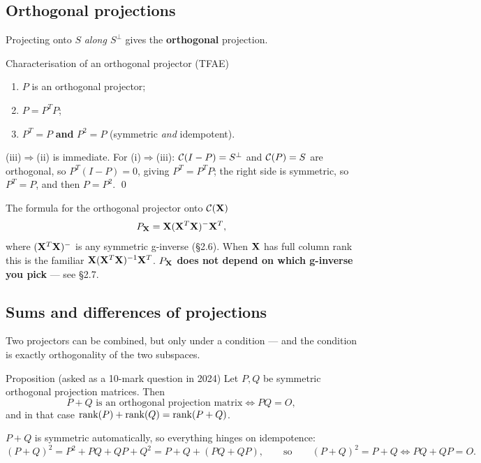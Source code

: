\documentclass[11pt]{article}
\begin{document}
\subsection{Orthogonal projections}

Projecting onto $S$ \emph{along $S^\perp$} gives the \textbf{orthogonal} projection.

\begin{idea}{Characterisation of an orthogonal projector (TFAE)}
\begin{enumerate}[label=(\roman*)]
  \item $P$ is an orthogonal projector;
  \item $P=P^TP$;
  \item $P^T=P$ \textbf{and} $P^2=P$ (symmetric \emph{and} idempotent).
\end{enumerate}
\end{idea}
\prf (iii)$\Rightarrow$(ii) is immediate. For (i)$\Rightarrow$(iii): $\mathcal{C}(I-P)=S^\perp$ and
$\mathcal{C}(P)=S$ are orthogonal, so $P^T(I-P)=0$, giving $P^T=P^TP$; the right side is symmetric,
so $P^T=P$, and then $P=P^2$. \qed

\begin{recipe}{The formula for the orthogonal projector onto $\mathcal{C}(\mathbf{X})$}
\[
  P_{\mathbf{X}}=\mathbf{X}(\mathbf{X}^T\mathbf{X})^{-}\mathbf{X}^T,
\]
where $(\mathbf{X}^T\mathbf{X})^{-}$ is any symmetric g-inverse (\S2.6). When $\mathbf{X}$ has full column rank
this is the familiar $\mathbf{X}(\mathbf{X}^T\mathbf{X})^{-1}\mathbf{X}^T$. \textbf{$P_{\mathbf{X}}$ does not depend on which
g-inverse you pick} --- see \S2.7.
\end{recipe}

\subsection{Sums and differences of projections}

Two projectors can be combined, but only under a condition --- and the condition is
exactly orthogonality of the two subspaces.

\begin{idea}{Proposition (asked as a 10-mark question in 2024)}
Let $P,Q$ be symmetric orthogonal projection matrices. Then
\[
  P+Q \text{ is an orthogonal projection matrix}\iff PQ=O,
\]
and in that case $\operatorname{rank}(P)+\operatorname{rank}(Q)=\operatorname{rank}(P+Q)$.
\end{idea}

\prf $P+Q$ is symmetric automatically, so everything hinges on idempotence:
\[
  (P+Q)^2=P^2+PQ+QP+Q^2=P+Q+(PQ+QP),
  \qquad\text{so}\qquad
  (P+Q)^2=P+Q\iff PQ+QP=O. \tag{$\ast$}
\]
\end{document}
